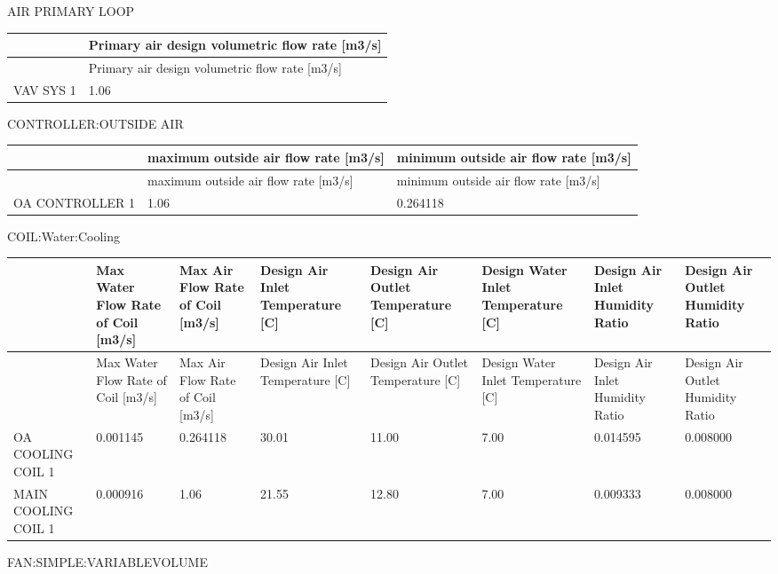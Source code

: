 AIR PRIMARY LOOP

\begin{longtable}[c]{@{}ll@{}}
\toprule
~ & Primary air design volumetric flow rate [m3/s] \tabularnewline
\midrule
\endfirsthead

\toprule
~ & Primary air design volumetric flow rate [m3/s] \tabularnewline
\midrule
\endhead

VAV SYS 1 & 1.06 \tabularnewline
\bottomrule
\end{longtable}

CONTROLLER:OUTSIDE AIR

\begin{longtable}[c]{>{\raggedright}p{1.5in}>{\raggedright}p{2.25in}>{\raggedright}p{2.25in}}
\toprule
~ & maximum outside air flow rate [m3/s] & minimum outside air flow rate [m3/s] \tabularnewline
\midrule
\endfirsthead

\toprule
~ & maximum outside air flow rate [m3/s] & minimum outside air flow rate [m3/s] \tabularnewline
\midrule
\endhead

OA CONTROLLER 1 & 1.06 & 0.264118 \tabularnewline
\bottomrule
\end{longtable}

COIL:Water:Cooling

\begin{longtable}[c]{>{\raggedright}p{0.75in}>{\raggedright}p{0.75in}>{\raggedright}p{0.75in}>{\raggedright}p{0.75in}>{\raggedright}p{0.75in}>{\raggedright}p{0.75in}>{\raggedright}p{0.75in}>{\raggedright}p{0.75in}}
\toprule
~ & Max Water Flow Rate of Coil [m3/s] & Max Air Flow Rate of Coil [m3/s] & Design Air Inlet Temperature [C] & Design Air Outlet Temperature [C] & Design Water Inlet Temperature [C] & Design Air Inlet Humidity Ratio & Design Air Outlet Humidity Ratio \tabularnewline
\midrule
\endfirsthead

\toprule
~ & Max Water Flow Rate of Coil [m3/s] & Max Air Flow Rate of Coil [m3/s] & Design Air Inlet Temperature [C] & Design Air Outlet Temperature [C] & Design Water Inlet Temperature [C] & Design Air Inlet Humidity Ratio & Design Air Outlet Humidity Ratio \tabularnewline
\midrule
\endhead

OA COOLING COIL 1 & 0.001145 & 0.264118 & 30.01 & 11.00 & 7.00 & 0.014595 & 0.008000 \tabularnewline
MAIN COOLING COIL 1 & 0.000916 & 1.06 & 21.55 & 12.80 & 7.00 & 0.009333 & 0.008000 \tabularnewline
\bottomrule
\end{longtable}

FAN:SIMPLE:VARIABLEVOLUME

